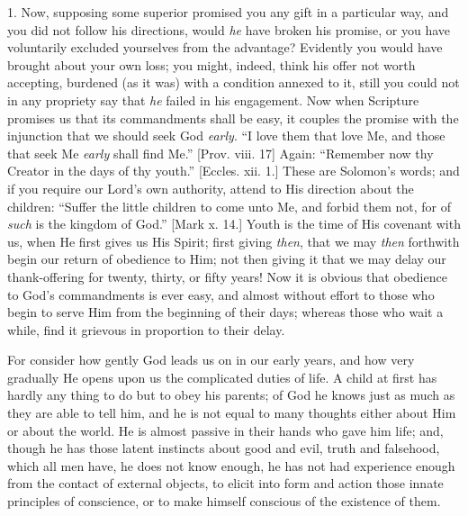 1. Now, supposing some superior promised you any gift
in a particular way, and you did not follow his
directions, would \emph{he} have broken his promise, or
you have voluntarily excluded yourselves from the
advantage? Evidently you would have brought about your
own loss; you might, indeed, think his offer not worth
accepting, burdened (as it was) with a condition annexed
to it, still you could not in any propriety say that \emph{he}
failed in his engagement. Now when Scripture promises us
that its commandments shall be easy, it couples the
promise with the injunction that we should seek God \emph{early}.
``I love them that love Me, and those that seek Me \emph{early}
shall find Me.'' [Prov. viii. 17] Again:
``Remember now thy Creator in the days of thy
youth.'' [Eccles. xii. 1.] These are Solomon's words;
and if you require our Lord's own authority, attend to
His direction about the children: ``Suffer the little
children to come unto Me, and forbid them not, for of \emph{such}
is the kingdom of God.'' [Mark x. 14.] Youth is the
time of His covenant with us, when He first gives us His
Spirit; first giving \emph{then}, that we may \emph{then}
forthwith begin our return of obedience to Him; not then
giving it that we may delay our thank-offering for
twenty, thirty, or fifty years! Now it is obvious that
obedience to God's commandments is ever easy, and almost
without effort to those who begin to serve Him from the
beginning of their days; whereas those who wait a while,
find it grievous in proportion to their delay.

For consider how gently God leads us on in our early
years, and how very gradually He opens upon us the
complicated duties of life. A child at first has hardly
any thing to do but to obey his parents; of God he knows
just as much as they are able to tell him, and he is not
equal to many thoughts either about Him or about the
world. He is almost passive in their hands who gave him
life; and, though he has those latent instincts about
good and evil, truth and falsehood, which all men have,
he does not know enough, he has not had experience enough
from the contact of external objects, to elicit into form
and action those innate principles of conscience, or to
make himself conscious of the existence of them.

